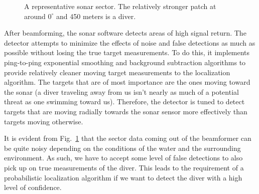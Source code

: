 \documentclass{article} %
\begin{document}
\begin{figure}[htbp]
  \centering
  \caption{A representative sonar sector. The relatively stronger patch at around $0^{\circ}$ and 450 meters is a diver.}
  \label{fig:sector_example}
\end{figure}

After beamforming, the sonar software detects areas of high signal return. The detector attempts to minimize the effects of noise and false detections as much as possible without losing the true target measurements. To do this, it implements ping-to-ping exponential smoothing and background subtraction algorithms to provide relatively cleaner moving target measurements to the localization algorithm. The targets that are of most importance are the ones moving toward the sonar (a diver traveling away from us isn't nearly as much of a potential threat as one swimming toward us). Therefore, the detector is tuned to detect targets that are moving radially towards the sonar sensor more effectively than targets moving otherwise.

It is evident from Fig.~\ref{fig:sector_example} that the sector data coming out of the beamformer can be quite noisy depending on the conditions of the water and the surrounding environment. As such, we have to accept some level of false detections to also pick up on true measurements of the diver. This leads to the requirement of a probabilistic localization algorithm if we want to detect the diver with a high level of confidence.
\end{document}
